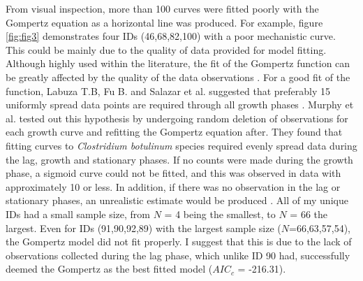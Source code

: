 \documentclass[11pt]{article}
\begin{document}
From visual inspection, more than 100 curves were fitted poorly with the Gompertz equation as a horizontal line was produced. For example, figure \ref{fig:fig3} demonstrates 
four IDs (46,68,82,100) with a poor mechanistic curve. This could be mainly due to the quality of data provided for model fitting. Although highly used within the literature, the fit of the Gompertz function can be
greatly affected by the quality of the data observations \cite{labuza_growth_1993}. For a good fit of the function, Labuza T.B, Fu B. and Salazar et al. suggested that preferably 15 uniformly spread
data points are required through all growth phases \cite{labuza_growth_1993,salazar_primary_2021}. Murphy et al. tested out this hypothesis by undergoing random deletion of observations
for each growth curve and refitting the Gompertz equation after. They found that fitting curves to \emph{Clostridium botulinum} species required evenly spread data
during the lag, growth and stationary phases. If no counts were made during the growth phase, a sigmoid curve could not be fitted, and this was
observed in data with approximately 10 or less. In addition, if there was no observation in the lag or stationary phases, an unrealistic 
estimate would be produced \cite{murphy_development_1996}. All of my unique IDs had a small sample size, from $N$ = 4 being the smallest, to $N$ = 66 the largest. Even for IDs
(91,90,92,89) with the largest sample size ($N$=66,63,57,54), the Gompertz model did not fit properly. I suggest that this is due to the lack
of observations collected during the lag phase, which unlike ID 90 had, successfully deemed the Gompertz as the best fitted model ($AIC_{c}$ = -216.31). 
\end{document}
